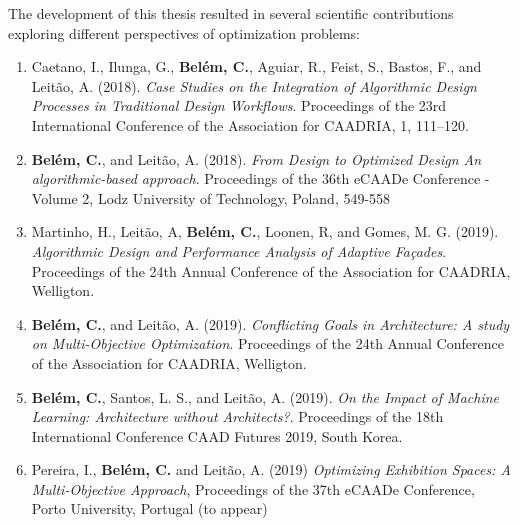 The development of this thesis resulted in several scientific contributions exploring different perspectives of optimization problems:

\begin{enumerate}
\item Caetano, I., Ilunga, G., \textbf{Belém, C.}, Aguiar, R., Feist, S., Bastos, F., and Leitão, A. (2018). \textit{Case Studies on the Integration of Algorithmic Design Processes in Traditional Design Workflows}. Proceedings of the 23rd International Conference of the Association for CAADRIA, 1, 111–120.

\item \textbf{Belém, C.}, and Leitão, A. (2018). \textit{From Design to Optimized Design An algorithmic-based approach}. Proceedings of the 36th eCAADe Conference - Volume 2, Lodz University of Technology, Poland, 549-558

\item Martinho, H., Leitão, A, \textbf{Belém, C.}, Loonen, R, and Gomes, M. G. (2019). \textit{Algorithmic Design and Performance Analysis of Adaptive Façades}. Proceedings of the 24th Annual Conference of the Association for CAADRIA, Welligton.

\item \textbf{Belém, C.}, and Leitão, A. (2019). \textit{Conflicting Goals in Architecture: A study on Multi-Objective Optimization}. Proceedings of the 24th Annual Conference of the Association for CAADRIA, Welligton.

\item \textbf{Belém, C.}, Santos, L. S., and Leitão, A. (2019). \textit{On the Impact of Machine Learning: Architecture without Architects?}. Proceedings of the 18th International Conference CAAD Futures 2019, South Korea.

\item Pereira, I., \textbf{Belém, C.} and Leitão, A. (2019) \textit{Optimizing Exhibition Spaces: A Multi-Objective Approach}, Proceedings of the 37th eCAADe Conference, Porto University, Portugal (to appear)

\end{enumerate}



